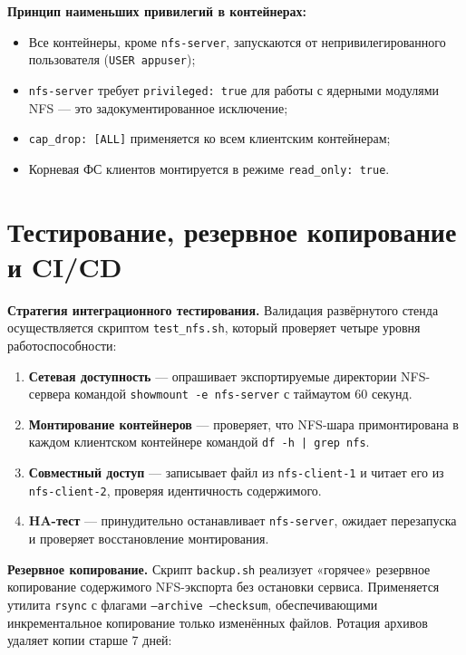 \documentclass[14pt,a4paper]{extarticle}
\begin{document}
	\textbf{Принцип наименьших привилегий в контейнерах:}
	
	\begin{itemize}
		\item Все контейнеры, кроме \texttt{nfs-server}, запускаются от непривилегированного
		пользователя (\texttt{USER appuser});
		\item \texttt{nfs-server} требует \texttt{privileged: true} для работы с ядерными
		модулями NFS --- это задокументированное исключение;
		\item \texttt{cap\_drop: [ALL]} применяется ко всем клиентским контейнерам;
		\item Корневая ФС клиентов монтируется в режиме \texttt{read\_only: true}.
	\end{itemize}
	
	\newpage
	
	\section{Тестирование, резервное копирование и CI/CD}
	
	\textbf{Стратегия интеграционного тестирования.}
	Валидация развёрнутого стенда осуществляется скриптом \texttt{test\_nfs.sh}, который
	проверяет четыре уровня работоспособности:
	
	\begin{enumerate}
		\item \textbf{Сетевая доступность} --- опрашивает экспортируемые директории NFS-сервера
		командой \texttt{showmount -e nfs-server} с таймаутом 60 секунд.
		\item \textbf{Монтирование контейнеров} --- проверяет, что NFS-шара примонтирована в
		каждом клиентском контейнере командой \texttt{df -h | grep nfs}.
		\item \textbf{Совместный доступ} --- записывает файл из \texttt{nfs-client-1} и читает
		его из \texttt{nfs-client-2}, проверяя идентичность содержимого.
		\item \textbf{HA-тест} --- принудительно останавливает \texttt{nfs-server}, ожидает
		перезапуска и проверяет восстановление монтирования.
	\end{enumerate}
	
	\textbf{Резервное копирование.}
	Скрипт \texttt{backup.sh} реализует «горячее» резервное копирование содержимого
	NFS-экспорта без остановки сервиса. Применяется утилита \texttt{rsync} с флагами
	\texttt{--archive --checksum}, обеспечивающими инкрементальное копирование только
	изменённых файлов. Ротация архивов удаляет копии старше 7 дней:
	
\end{document}
